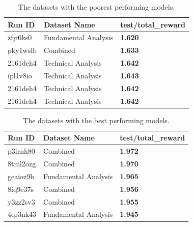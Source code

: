 \documentclass[../xlapes02]{subfiles}
\begin{document}
    \begin{table}[!ht]
        \centering
        \label{tab:worst-datasets}
        \begin{tabular}{|l|l|l|}
            \hline
            \textbf{Run ID} & \textbf{Dataset Name} & \textbf{test/total\_reward}                \\ \hline
            zfjr0ks0        & Fundamental Analysis  & \textcolor[RGB]{150,50,50}{\textbf{1.620}} \\ \hline
            pky1wslb        & Combined              & \textcolor[RGB]{150,50,50}{\textbf{1.633}} \\ \hline
            2161deh4        & Technical Analysis    & \textcolor[RGB]{150,50,50}{\textbf{1.642}} \\ \hline
            ipl1v8io        & Technical Analysis    & \textcolor[RGB]{150,50,50}{\textbf{1.643}} \\ \hline
            2161deh4        & Technical Analysis    & \textcolor[RGB]{150,50,50}{\textbf{1.642}} \\ \hline
            2161deh4        & Technical Analysis    & \textcolor[RGB]{150,50,50}{\textbf{1.642}} \\ \hline
        \end{tabular}
        \caption{The datasets with the poorest performing models.}
    \end{table}

    \begin{table}[!ht]
        \centering
        \label{tab:best-datasets}
        \begin{tabular}{|l|l|l|}
            \hline
            \textbf{Run ID} & \textbf{Dataset Name} & \textbf{test/total\_reward}                \\ \hline
            p3irnh80        & Combined              & \textcolor[RGB]{50,150,50}{\textbf{1.972}} \\ \hline
            8tml2ozg        & Combined              & \textcolor[RGB]{50,150,50}{\textbf{1.970}} \\ \hline
            geaioz9h        & Fundamental Analysis  & \textcolor[RGB]{50,150,50}{\textbf{1.965}} \\ \hline
            8iq9e37s        & Combined              & \textcolor[RGB]{50,150,50}{\textbf{1.956}} \\ \hline
            y3zz2sv3        & Combined              & \textcolor[RGB]{50,150,50}{\textbf{1.955}} \\ \hline
            4qr3nk43        & Fundamental Analysis  & \textcolor[RGB]{50,150,50}{\textbf{1.945}} \\ \hline
        \end{tabular}
        \caption{The datasets with the best performing models.}
    \end{table}
\end{document}
